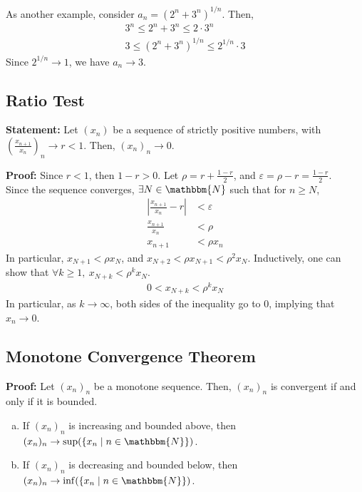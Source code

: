 \documentclass[10pt]{extarticle}
\newcommand{\N}{\mathbbm{N}}
\begin{document}
    As another example, consider $a_n = \left(2^n + 3^n\right)^{1/n}$. Then,
    \begin{align*}
      3^n \leq 2^n + 3^n \leq 2\cdot 3^n\\
      3 \leq \left(2^n + 3^n\right)^{1/n} \leq 2^{1/n}\cdot 3
    \end{align*}
    Since $2^{1/n} \rightarrow 1$, we have $a_n \rightarrow 3$.
  \subsection{Ratio Test}%
  \textbf{Statement:} Let $\left(x_n\right)$ be a sequence of strictly positive numbers, with $\left(\frac{x_{n+1}}{x_n}\right)_n \rightarrow r < 1$. Then, $(x_n)_n \rightarrow 0$.

  \textbf{Proof:} Since $r < 1$, then $1-r > 0$. Let $\rho = r + \frac{1-r}{2}$, and $\varepsilon = \rho - r = \frac{1-r}{2}$.\\

    Since the sequence converges, $\exists N\in\N$ such that for $n\geq N$,
    \begin{align*}
      \left|\frac{x_{n+1}}{x_n} - r \right| &< \varepsilon\\
      \frac{x_{n+1}}{x_n} &< \rho\\
      x_{n+1} &< \rho x_n
    \end{align*}
    In particular, $x_{N+1} < \rho x_N$, and $x_{N+2} < \rho x_{N+1} < \rho^2 x_N$. Inductively, one can show that $\forall k\geq 1,~x_{N+k} < \rho^{k}x_{N}$.
    \begin{align*}
      0 < x_{N + k} < \rho^{k}x_{N}
    \end{align*}
    In particular, as $k \rightarrow \infty$, both sides of the inequality go to $0$, implying that $x_{n}\rightarrow 0$.
  \subsection{Monotone Convergence Theorem}%
  \textbf{Proof:} Let $(x_n)_n$ be a monotone sequence. Then, $(x_n)_n$ is convergent if and only if it is bounded.
    \begin{enumerate}[(a)]
      \item If $(x_n)_n$ is increasing and bounded above, then $(x_n)_n \rightarrow \sup(\{x_n\mid n\in\N\})$.
      \item If $(x_n)_n$ is decreasing and bounded below, then $(x_n)_n \rightarrow \inf(\{x_n\mid n\in\N\})$.
    \end{enumerate}
\end{document}
